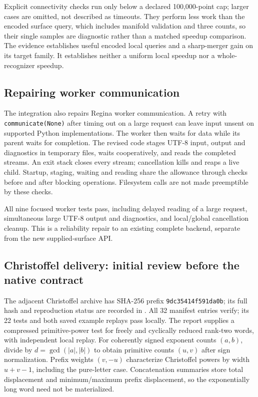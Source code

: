 Explicit connectivity checks run only below a declared 100,000-point cap;
larger cases are omitted, not described as timeouts. They perform less work
than the encoded surface query, which includes manifold validation and
three counts, so their single samples are diagnostic rather than a matched
speedup comparison. The evidence establishes useful encoded local queries
and a sharp-merger gain on its target family. It establishes neither a
uniform local speedup nor a whole-recognizer speedup.

\subsection{Repairing worker communication}

The integration also repairs Regina worker communication. A retry with
\texttt{communicate(None)} after timing out on a large request can
leave input unsent on supported Python implementations. The worker then
waits for data while its parent waits for completion. The revised code
stages UTF-8 input, output and diagnostics in temporary files, waits
cooperatively, and reads the completed streams. An exit stack closes every
stream; cancellation kills and reaps a live child. Startup, staging, waiting
and reading share the allowance through checks before and after blocking
operations. Filesystem calls are not made preemptible by these checks.

All nine focused worker tests pass, including delayed reading of a large
request, simultaneous large UTF-8 output and diagnostics, and local/global
cancellation cleanup. This is a reliability repair to an existing complete
backend, separate from the new supplied-surface API.

\subsection{Christoffel delivery: initial review before the native contract}

The adjacent Christoffel archive has SHA-256 prefix
\texttt{9dc35414f591da0b}; its full hash and reproduction status are recorded
in .
All 32 manifest entries verify; its 22 tests and both saved example
replays pass locally. The report supplies a compressed primitive-power
test for freely and cyclically reduced rank-two words, with independent
local replay. For coherently signed exponent counts $(a,b)$, divide by
$d=\gcd(|a|,|b|)$ to obtain primitive counts $(u,v)$ after sign
normalization. Prefix weights $(v,-u)$ characterize Christoffel powers
by width $u+v-1$, including the pure-letter case. Concatenation summaries
store total displacement and minimum/maximum prefix displacement, so
the exponentially long word need not be materialized.

